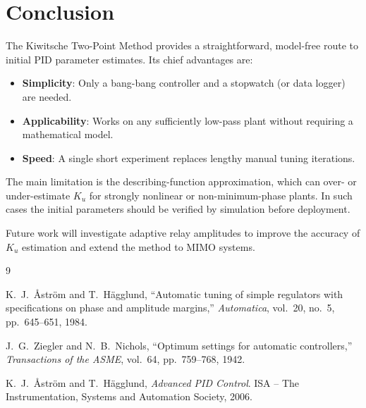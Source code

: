 \documentclass[12pt,a4paper]{article}
\begin{document}
\section{Conclusion}
\label{sec:conclusion}

The Kiwitsche Two-Point Method provides a straightforward, model-free route to initial
PID parameter estimates.  Its chief advantages are:

\begin{itemize}
  \item \textbf{Simplicity}: Only a bang-bang controller and a stopwatch (or data
        logger) are needed.
  \item \textbf{Applicability}: Works on any sufficiently low-pass plant without
        requiring a mathematical model.
  \item \textbf{Speed}: A single short experiment replaces lengthy manual tuning
        iterations.
\end{itemize}

The main limitation is the describing-function approximation, which can over- or
under-estimate $K_u$ for strongly nonlinear or non-minimum-phase plants.  In such
cases the initial parameters should be verified by simulation before deployment.

Future work will investigate adaptive relay amplitudes to improve the accuracy of
$K_u$ estimation and extend the method to MIMO systems.

\begin{thebibliography}{9}

K.~J.~\AA{}str\"om and T.~H\"agglund,
``Automatic tuning of simple regulators with specifications on phase and amplitude
margins,''
\textit{Automatica}, vol.~20, no.~5, pp.~645--651, 1984.

J.~G.~Ziegler and N.~B.~Nichols,
``Optimum settings for automatic controllers,''
\textit{Transactions of the ASME}, vol.~64, pp.~759--768, 1942.

K.~J.~\AA{}str\"om and T.~H\"agglund,
\textit{Advanced PID Control}.
ISA -- The Instrumentation, Systems and Automation Society, 2006.

\end{thebibliography}
\end{document}
